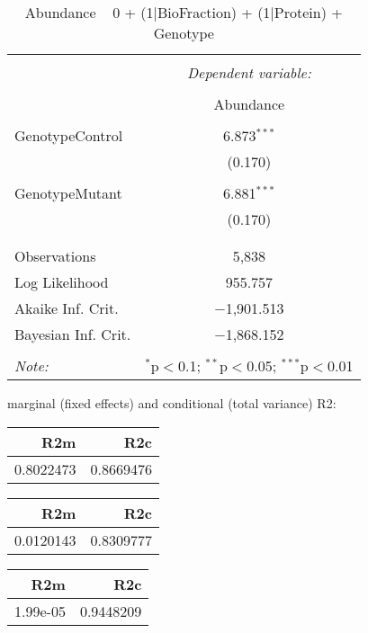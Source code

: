 \documentclass[11pt]{report}
\begin{document}
\begin{table}[!htbp] \centering 
  \caption{Abundance ~ 0 + (1|BioFraction) + (1|Protein) + Genotype} 
  \label{} 
\begin{tabular}{@{\extracolsep{5pt}}lc} 
\\[-1.8ex]\hline 
\hline \\[-1.8ex] 
 & \multicolumn{1}{c}{\textit{Dependent variable:}} \\ 
\cline{2-2} 
\\[-1.8ex] & Abundance \\ 
\hline \\[-1.8ex] 
 GenotypeControl & 6.873$^{***}$ \\ 
  & (0.170) \\ 
  & \\ 
 GenotypeMutant & 6.881$^{***}$ \\ 
  & (0.170) \\ 
  & \\ 
\hline \\[-1.8ex] 
Observations & 5,838 \\ 
Log Likelihood & 955.757 \\ 
Akaike Inf. Crit. & $-$1,901.513 \\ 
Bayesian Inf. Crit. & $-$1,868.152 \\ 
\hline 
\hline \\[-1.8ex] 
\textit{Note:}  & \multicolumn{1}{r}{$^{*}$p$<$0.1; $^{**}$p$<$0.05; $^{***}$p$<$0.01} \\ 
\end{tabular} 
\end{table} 
marginal (fixed effects) and conditional (total variance) R2:

\begin{tabular}{r|r}
\hline
R2m & R2c\\
\hline
0.8022473 & 0.8669476\\
\hline
\end{tabular}

\begin{tabular}{r|r}
\hline
R2m & R2c\\
\hline
0.0120143 & 0.8309777\\
\hline
\end{tabular}

\begin{tabular}{r|r}
\hline
R2m & R2c\\
\hline
1.99e-05 & 0.9448209\\
\hline
\end{tabular}
\end{document}
